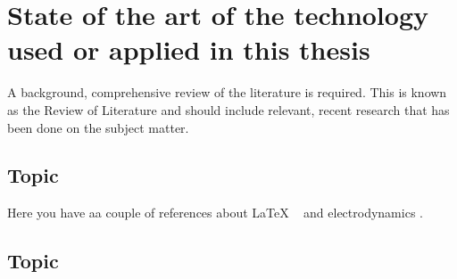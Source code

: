 \clearpage\section{State of the art of the technology used or applied in this thesis}

 {A background, comprehensive review of the literature is required. This is known as the Review of Literature and should
  include relevant, recent research that has been done on the subject matter.}

\subsection{Topic}

Here you have aa couple of references about LaTeX ~\cite{latexcompanion} and electrodynamics \cite{einstein}.

\bigskip

\subsection{Topic}
